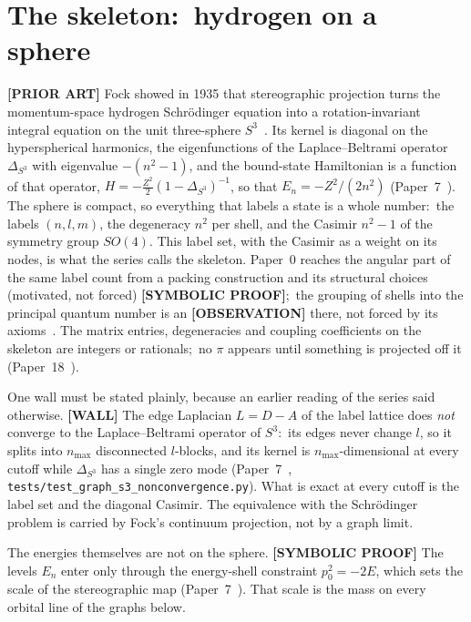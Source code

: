 \documentclass[aps,pra,twocolumn,superscriptaddress,longbibliography]{revtex4-2}
\newcommand{\gvc}[2]{#2}
\begin{document}
\section{The skeleton:\ hydrogen on a sphere}
\label{sec:skeleton}

\textbf{[PRIOR ART]} Fock showed in 1935 that stereographic projection
turns the momentum-space hydrogen Schr\"odinger equation into a
rotation-invariant integral equation on the unit three-sphere
$S^3$~\cite{fock1935}.  Its kernel is diagonal on the hyperspherical
harmonics, the eigenfunctions of the Laplace--Beltrami operator
$\Delta_{S^3}$ with eigenvalue $-(n^2-1)$, and the bound-state
Hamiltonian is a function of that operator,
$H=-\tfrac{Z^2}{2}(1-\Delta_{S^3})^{-1}$, so that $E_n=-Z^2/(2n^2)$
(Paper~7~\cite{loutey_paper7}).  The sphere is compact, so everything
that labels a state is a whole number:\ the labels $(n,l,m)$, the
degeneracy $n^2$ per shell, and the Casimir $n^2-1$ of the symmetry group
$SO(4)$.  This label set, with the Casimir as a weight on its nodes, is
what the series calls the skeleton.  Paper~0 reaches the angular part of
the same label count from a packing construction and its structural
choices (motivated, not forced) \textbf{[SYMBOLIC PROOF]};\ the grouping of shells into the principal quantum number is an
\textbf{[OBSERVATION]} there, not forced by its
axioms~\cite{loutey_paper0}.  The matrix entries, degeneracies and
coupling coefficients on the skeleton are integers or rationals;\ no
$\pi$ appears until something is projected off it
(Paper~18~\cite{loutey_paper18}).

One wall must be stated plainly, because an earlier reading of the
series said otherwise.  \textbf{[WALL]} \gvc{graph-s3-wall}{The edge
Laplacian $L=D-A$ of the label lattice does \emph{not} converge to the
Laplace--Beltrami operator of $S^3$:\ its edges never change $l$, so it
splits into $n_{\max}$ disconnected $l$-blocks, and its kernel is
$n_{\max}$-dimensional at every cutoff while $\Delta_{S^3}$ has a single
zero mode} (Paper~7~\cite{loutey_paper7},
\texttt{tests/test\_graph\_s3\_nonconvergence.py}).  What is exact at
every cutoff is the label set and the diagonal Casimir.  The equivalence
with the Schr\"odinger problem is carried by Fock's continuum projection,
not by a graph limit.

The energies themselves are not on the sphere.  \textbf{[SYMBOLIC
PROOF]} The levels $E_n$ enter only through the energy-shell constraint
$p_0^2=-2E$, which sets the scale of the stereographic map
(Paper~7~\cite{loutey_paper7}).  That scale is the mass on every orbital
line of the graphs below.
\end{document}
